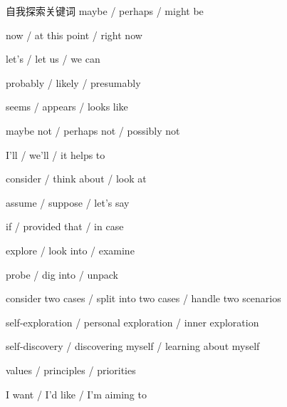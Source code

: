 \begin{PromptBox}{自我探索关键词}
maybe / perhaps / might be

now / at this point / right now

let's / let us / we can

probably / likely / presumably

seems / appears / looks like

maybe not / perhaps not / possibly not

I’ll / we’ll / it helps to

consider / think about / look at

assume / suppose / let's say

if / provided that / in case

explore / look into / examine

probe / dig into / unpack

consider two cases / split into two cases / handle two scenarios

self-exploration / personal exploration / inner exploration

self-discovery / discovering myself / learning about myself

values / principles / priorities

I want / I’d like / I’m aiming to
\end{PromptBox}
